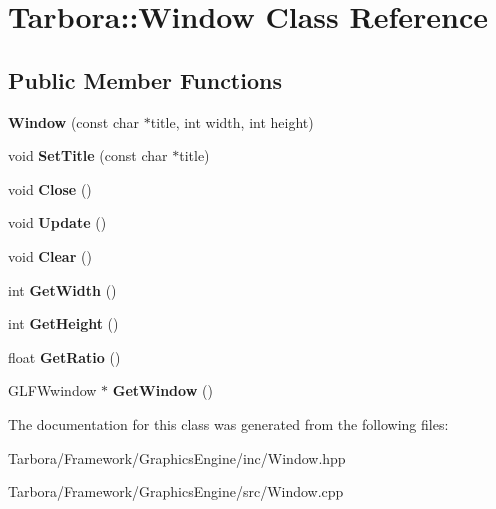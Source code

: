 \hypertarget{classTarbora_1_1Window}{}\section{Tarbora\+:\+:Window Class Reference}
\label{classTarbora_1_1Window}
\subsection*{Public Member Functions}
\begin{DoxyCompactItemize}
\item 
\mbox{\label{classTarbora_1_1Window_a04d7d84e42b7e9929fa8fc1990a3d690}} 
{\bfseries Window} (const char $\ast$title, int width, int height)
\item 
\mbox{\label{classTarbora_1_1Window_a7a937281939b010abfcf4ee3b5af7965}} 
void {\bfseries Set\+Title} (const char $\ast$title)
\item 
\mbox{\label{classTarbora_1_1Window_a4364444d692f3987cad5dd7af2ef500c}} 
void {\bfseries Close} ()
\item 
\mbox{\label{classTarbora_1_1Window_ad5a3c70ba1dae1504632c0c5c1c4400c}} 
void {\bfseries Update} ()
\item 
\mbox{\label{classTarbora_1_1Window_ac421916de237342ac7bd76ca93b7bb66}} 
void {\bfseries Clear} ()
\item 
\mbox{\label{classTarbora_1_1Window_a63cfffc2853e2ccc3b98e1321d87380f}} 
int {\bfseries Get\+Width} ()
\item 
\mbox{\label{classTarbora_1_1Window_a96caf5673282b3b36025d978483171b4}} 
int {\bfseries Get\+Height} ()
\item 
\mbox{\label{classTarbora_1_1Window_a8793c64c13ae101011895dd7b0aabc54}} 
float {\bfseries Get\+Ratio} ()
\item 
\mbox{\label{classTarbora_1_1Window_abe9f57d917d16ba6f8a6cf9de1bd98d1}} 
G\+L\+F\+Wwindow $\ast$ {\bfseries Get\+Window} ()
\end{DoxyCompactItemize}


The documentation for this class was generated from the following files\+:\begin{DoxyCompactItemize}
\item 
Tarbora/\+Framework/\+Graphics\+Engine/inc/Window.\+hpp\item 
Tarbora/\+Framework/\+Graphics\+Engine/src/Window.\+cpp\end{DoxyCompactItemize}
